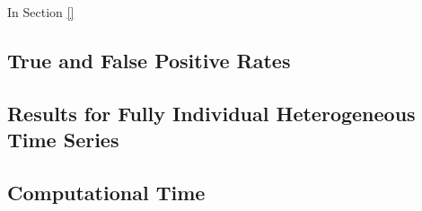 In Section \ref{}

\subsection{True and False Positive Rates}\label{supmat_subsec:sims_tpr_fpr}




\subsection{Results for Fully Individual Heterogeneous Time Series}\label{supmat_subsec:sims_fully_individual}




\subsection{Computational Time}\label{supmat_subsec:sims_comp_time}



